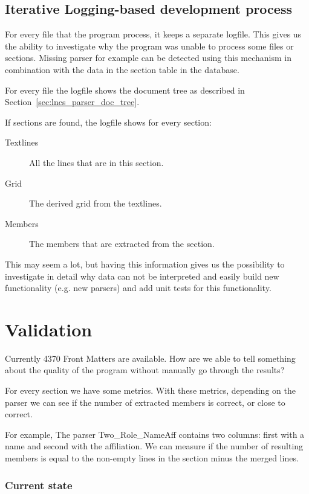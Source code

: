 \documentclass{ou-report}
\begin{document}
\subsection{Iterative Logging-based development process}
For every file that the program process, it keeps a separate logfile. This gives
us the ability to investigate why the program was unable to process some files 
or sections. Missing parser for example can be detected using this mechanism in
combination with the data in the section table in the database.

For every file the logfile shows the document tree as described in 
Section~\ref{sec:lncs_parser_doc_tree}. 

If sections are found, the logfile shows for every section:
\begin{description}
    \item[Textlines] All the lines that are in this section.
    \item[Grid] The derived grid from the textlines.
    \item[Members] The members that are extracted from the section.
\end{description}
This may seem a lot, but having this information gives us the possibility to 
investigate in detail why data can not be interpreted and easily build new 
functionality (e.g. new parsers) and add unit tests for this functionality.

\section{Validation}
Currently 4370 Front Matters are available. How are we able to tell something 
about the quality of the program without manually go through the results?

For every section we have some metrics. With these metrics, depending on the
parser we can see if the number of extracted members is correct, or close to
correct.

For example, The parser Two\_Role\_NameAff contains two columns: first with a name
and second with the affiliation. We can measure if the number of resulting 
members is equal to the non-empty lines in the section minus the merged lines.



\subsubsection{Current state}
\end{document}
